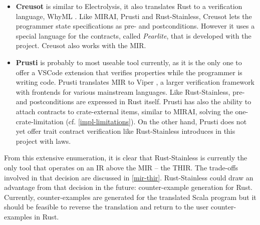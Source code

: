 \begin{itemize}
\item \textbf{Creusot} \cite{creusot} is similar to Electrolysis, it also
translates Rust to a verification language, WhyML \cite{why3}. Like MIRAI,
Prusti and Rust-Stainless, Creusot lets  the programmer state specifications as
pre- and postconditions. However it uses a special language for the contracts,
called \emph{Pearlite}, that is developed with the project. Creusot also works
with the MIR.

\item \textbf{Prusti} \cite{prusti} is probably to most useable tool currently,
as it is the only one  to offer a VSCode extension that verifies properties
while the programmer is writing code. Prusti translates MIR to Viper
\cite{viper}, a larger verification framework with frontends for various
mainstream languages. Like Rust-Stainless, pre- and postconditions are expressed
in Rust itself. Prusti has also the ability to attach contracts to
crate-external items, similar to MIRAI, solving the one-crate-limitation (cf.
\autoref{impl-limitations}). On the other hand, Prusti does not yet offer trait
contract verification like Rust-Stainless introduces in this project with laws.

\end{itemize}

\hfill \break \noindent  From this extensive enumeration, it is clear that
Rust-Stainless is currently the only tool that operates on an IR above the MIR
-- the THIR. The trade-offs involved in that decision are discussed in
\autoref{mir-thir}. Rust-Stainless could draw an advantage from that decision in
the future: counter-example generation for Rust. Currently, counter-examples are
generated for the translated Scala program but it should be feasible to reverse
the translation and return to the user counter-examples in Rust.
